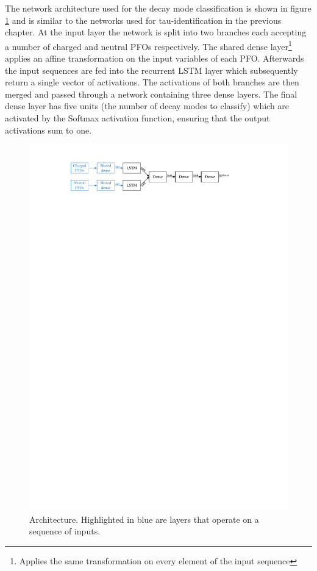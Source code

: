 

The network architecture used for the decay mode classification is shown in
figure \ref{fig:pfo_rnn_baseline_arch} and is similar to the networks used for
tau-identification in the previous chapter. At the input layer the network is
split into two branches each accepting a number of charged and neutral PFOs
respectively. The shared dense layer\footnote{Applies the same transformation on
  every element of the input sequence} applies an affine transformation on the
input variables of each PFO. Afterwards the input sequences are fed into the
recurrent LSTM layer which subsequently return a single vector of activations.
The activations of both branches are then merged and passed through a network
containing three dense layers. The final dense layer has five units (the number
of decay modes to classify) which are activated by the Softmax activation
function, ensuring that the output activations sum to one.

\begin{figure}[ht]
  \centering
  \includegraphics{./figures/decay_mode_classification/baseline_architecture.pdf}
  \caption{Architecture. Highlighted in blue are layers that operate on a sequence of inputs.}
  \label{fig:pfo_rnn_baseline_arch}
\end{figure}

